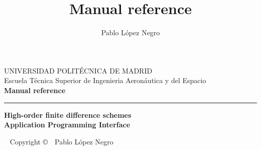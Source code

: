 \documentclass[11pt,twoside,a4paper]{book}
\title{\textbf{Manual reference}}
\author{Pablo L\'opez Negro}
\begin{document}
\renewcommand{\figurename}{Figure}
\renewcommand{\tablename}{Table}
\renewcommand{\refname}{References}
\renewcommand{\contentsname}{\Large\textbf{Table of contents}}
\renewcommand{\listfigurename}{List of figures}
\renewcommand{\listtablename}{List of tables}
\renewcommand{\appendixname}{Appendix}
\renewcommand{\appendixtocname}{Appendix}
\renewcommand{\appendixpagename}{Appendix}

\newcommand{\ww}[1]
{
{\color{red}{\textbf {#1}}} \index{#1}
} 
\newcommand{\wk}[1]
{
{\textbf {#1}} \index{#1}
} 
\newcommand{\wb}[1]
{
{\color{blue}{\texttt {#1}}} \index{#1}
} 


\thispagestyle{empty}




\vspace{1 cm}

{\selectfont}
\begin{center} 
{{\Large UNIVERSIDAD POLIT\'ECNICA DE MADRID}\\[1 cm]
{\Large Escuela T\'ecnica Superior de Ingenieria Aeron\'autica y del
Espacio}}\\[3cm] 

\LARGE{\textbf{Manual reference}}
\rule {16cm}{1pt}

\vspace{0.5cm}

\LARGE{\Huge \textbf{High-order finite difference schemes}}\\[0.5cm] 
\textbf{ \textbf{Application Programming Interface}}\\[0.5cm]

\end{center} 



\newpage
~\vfill
\thispagestyle{empty}
\setlength{\parindent}{0pt}
\setlength{\parskip}{\baselineskip}
Copyright \copyright\ \the\year\ Pablo L\'opez Negro
\end{document}
